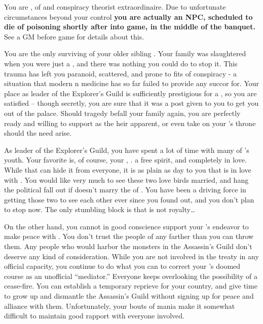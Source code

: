 \documentclass[char]{NeptuneBall}
\begin{document}
\name{\cPlant{}}

You are \cPlant{}, \cPlant{\prince} of \pAtlantis{} and conspiracy theorist extraordinaire. Due to unfortunate circumstances beyond your control {\bf you are actually an NPC, scheduled to die of poisoning shortly after \cTTwo{} into game, in the middle of the banquet.}  See a GM before game for details about this.

You are the only surviving \cPlant{\sibling} of your older sibling \cKing{}. Your family was slaughtered when you were just a \cPlant{\kid}, and there was nothing you could do to stop it. This trauma has left you paranoid, scattered, and prone to fits of conspiracy - a situation that modern \pAtlantis{}n medicine has so far failed to provide any succor for. Your place as leader of the Explorer's Guild is sufficiently prestigious for a \cPlant{\prince}, so you are satisfied -- though secretly, you are sure that it was a post given to you to get you out of the palace. Should tragedy befall your family again, you are perfectly ready and willing to support \cPrincess{\Prince} \cPrincess{} as the heir apparent, or even take on your \cKing{\sibling}'s throne should the need arise.

As leader of the Explorer's Guild, you have spent a lot of time with many of \pAtlantis{}'s youth. Your favorite is, of course, your \cPrincess{\nephew}, \cPrincess{\Prince} \cPrincess{}. \cPrincess{\They} \cPrincess{\are} a free spirit, and completely in love. While \cPrincess{\they}  that \cPrincess{\they} can hide it from everyone, it is as plain as day to you that \cPrincess{} is in love with \cDiplomat{}. You would like very much to see these two love birds married, and hang the political fall out if \cPrincess{} doesn't marry the \cPrince{\prince} of \pPacifica{}. You have been a driving force in getting those two to see each other ever since you found out, and you don't plan to stop now. The only stumbling block is that \cDiplomat{} is not royalty\ldots

On the other hand, you cannot in good conscience support your \cKing{\sibling}'s endeavor to make peace with \pPacifica{}. You don't trust the people of \pPacifica{} any farther than you can throw them. Any people who would harbor the monsters in the Assassin's Guild don't deserve any kind of consideration. While you are not involved in the treaty in any official capacity, you continue to do what you can to correct your \cKing{\sibling}'s doomed course as an unofficial ``mediator.'' Everyone keeps overlooking the possibility of a cease-fire. You can establish a temporary reprieve for your country, and give \pPacifica{} time to grow up and dismantle the Assassin's Guild without signing up for peace and alliance with them. Unfortunately, your bouts of mania make it somewhat difficult to maintain good rapport with everyone involved.
\end{document}

